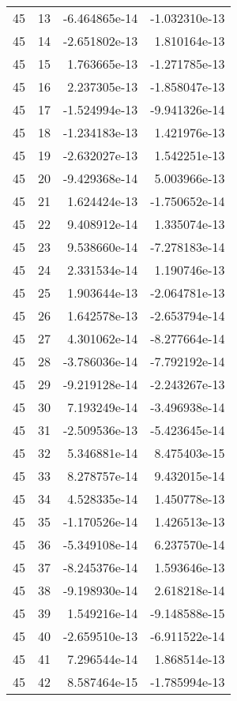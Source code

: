 \begin{tabular}{rrrr}
  45 &   13 & -6.464865e-14 & -1.032310e-13 \\
  45 &   14 & -2.651802e-13 &  1.810164e-13 \\
  45 &   15 &  1.763665e-13 & -1.271785e-13 \\
  45 &   16 &  2.237305e-13 & -1.858047e-13 \\
  45 &   17 & -1.524994e-13 & -9.941326e-14 \\
  45 &   18 & -1.234183e-13 &  1.421976e-13 \\
  45 &   19 & -2.632027e-13 &  1.542251e-13 \\
  45 &   20 & -9.429368e-14 &  5.003966e-13 \\
  45 &   21 &  1.624424e-13 & -1.750652e-14 \\
  45 &   22 &  9.408912e-14 &  1.335074e-13 \\
  45 &   23 &  9.538660e-14 & -7.278183e-14 \\
  45 &   24 &  2.331534e-14 &  1.190746e-13 \\
  45 &   25 &  1.903644e-13 & -2.064781e-13 \\
  45 &   26 &  1.642578e-13 & -2.653794e-14 \\
  45 &   27 &  4.301062e-14 & -8.277664e-14 \\
  45 &   28 & -3.786036e-14 & -7.792192e-14 \\
  45 &   29 & -9.219128e-14 & -2.243267e-13 \\
  45 &   30 &  7.193249e-14 & -3.496938e-14 \\
  45 &   31 & -2.509536e-13 & -5.423645e-14 \\
  45 &   32 &  5.346881e-14 &  8.475403e-15 \\
  45 &   33 &  8.278757e-14 &  9.432015e-14 \\
  45 &   34 &  4.528335e-14 &  1.450778e-13 \\
  45 &   35 & -1.170526e-14 &  1.426513e-13 \\
  45 &   36 & -5.349108e-14 &  6.237570e-14 \\
  45 &   37 & -8.245376e-14 &  1.593646e-13 \\
  45 &   38 & -9.198930e-14 &  2.618218e-14 \\
  45 &   39 &  1.549216e-14 & -9.148588e-15 \\
  45 &   40 & -2.659510e-13 & -6.911522e-14 \\
  45 &   41 &  7.296544e-14 &  1.868514e-13 \\
  45 &   42 &  8.587464e-15 & -1.785994e-13 \\

\end{tabular}
